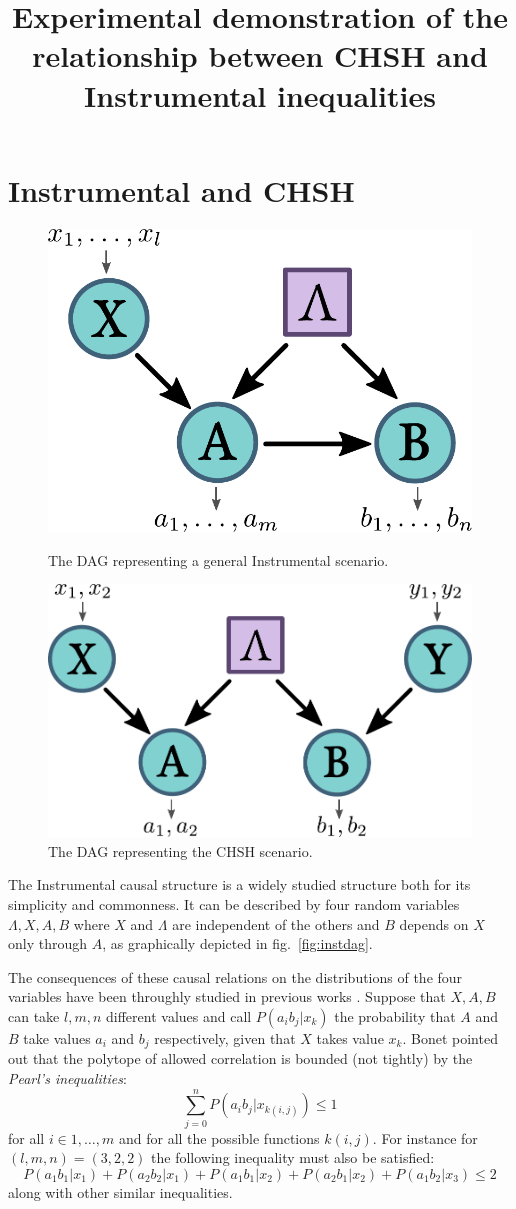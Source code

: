 \documentclass{article}
\title{Experimental demonstration of the relationship between CHSH and Instrumental inequalities}
\begin{document}
\maketitle

\section*{Instrumental and CHSH}
\begin{figure}[h]
    \centering
    \parbox{.4\textwidth}{
        \includegraphics[width=.4\textwidth]{images/instdag.pdf}
        \caption{The DAG representing a general Instrumental scenario.}
        \label{fig:instdag}
    }
    \qquad
    \parbox{.4\textwidth}{
        \includegraphics[width=.4\textwidth]{images/chshdag.pdf}
        \caption{The DAG representing the CHSH scenario.}
        \label{fig:chshdag}
    }
\end{figure}

The Instrumental causal structure is a widely studied
structure both for its simplicity and commonness.
It can be described by four random variables $\Lambda, X, A, B$ where $X$ and
$\Lambda$ are independent of the others and $B$ depends on $X$ only through $A$,
as graphically depicted in fig.~\ref{fig:instdag}.

The consequences of these causal relations on the distributions of the four
variables have been throughly studied in previous works \cite{pearl1995,
bonet2001}.
Suppose that $X, A, B$ can take $l,m,n$ different values and 
call $P(a_i b_j | x_k)$ the probability that $A$ and $B$ take values $a_i$
and $b_j$ respectively, given that $X$ takes value $x_k$.
Bonet \cite{bonet2001} pointed out that the polytope of allowed
correlation is bounded (not tightly) by the \emph{Pearl's inequalities}:
\begin{equation}
    \sum_{j=0}^{n} P(a_i b_j|x_{k(i,j)}) \le 1
    \label{eq:pearl_ineq}
\end{equation}
for all $i \in {1,\ldots, m}$ and for all the possible functions $k(i,j)$.
For instance for $(l,m,n) = (3,2,2)$ the following inequality must also be satisfied:
\begin{equation}
    P(a_1 b_1 | x_1) + P(a_2 b_2 | x_1) + 
    P(a_1 b_1 | x_2) + P(a_2 b_1 | x_2) + 
    P(a_1 b_2 | x_3) \le 2
    \label{eq:bonet_ineq}
\end{equation}
along with other similar inequalities.
\end{document}
